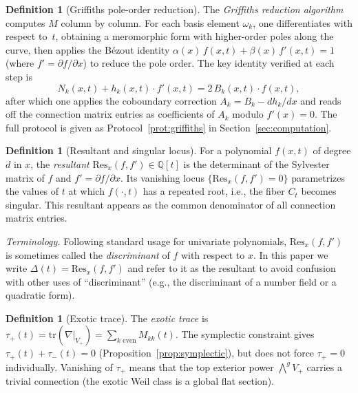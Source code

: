\documentclass[11pt]{article}
\theoremstyle{plain}
\theoremstyle{definition}
\newtheorem{definition}[theorem]{Definition}
\theoremstyle{remark}
\newcommand{\Q}{\mathbb{Q}}
\newcommand{\tr}{\mathrm{tr}}
\begin{document}
\begin{definition}[Griffiths pole-order reduction]\label{def:griffiths}
The \emph{Griffiths reduction algorithm}~\cite{Griffiths1969} computes
$M$ column by column.  For each basis element $\omega_k$, one
differentiates with respect to~$t$, obtaining a meromorphic form with
higher-order poles along the curve, then applies the B\'ezout identity
$\alpha(x)\, f(x,t) + \beta(x)\, f'(x,t) = 1$ (where $f' = \partial f / \partial x$)
to reduce the pole order.  The key identity verified at each step is
\begin{equation}\label{eq:griffiths-id-prelim}
  N_k(x,t) + h_k(x,t) \cdot f'(x,t) = 2\, B_k(x,t) \cdot f(x,t),
\end{equation}
after which one applies the coboundary correction $A_k = B_k - dh_k/dx$
and reads off the connection matrix entries as coefficients of $A_k$
modulo $f'(x) = 0$.  The full protocol is given as
Protocol~\ref{prot:griffiths} in Section~\ref{sec:computation}.
\end{definition}

\begin{definition}[Resultant and singular locus]\label{def:resultant}
For a polynomial $f(x,t)$ of degree $d$ in $x$, the \emph{resultant}
$\mathrm{Res}_x(f, f') \in \Q[t]$ is the determinant of the Sylvester
matrix of $f$ and $f' = \partial f / \partial x$.  Its vanishing locus
$\{\mathrm{Res}_x(f, f') = 0\}$ parametrizes the values of $t$ at
which $f(\cdot, t)$ has a repeated root, i.e., the fiber $C_t$ becomes
singular.  This resultant appears as the common denominator of all
connection matrix entries.

\emph{Terminology.}  Following standard usage for univariate
polynomials, $\mathrm{Res}_x(f, f')$ is sometimes called the
\emph{discriminant} of $f$ with respect to $x$.  In this paper we
write $\Delta(t) = \mathrm{Res}_x(f, f')$ and refer to it as the
resultant to avoid confusion with other uses of ``discriminant''
(e.g., the discriminant of a number field or a quadratic form).
\end{definition}

\begin{definition}[Exotic trace]\label{def:exotic-trace}
The \emph{exotic trace} is
$\tau_+(t) = \tr(\nabla|_{V_+}) = \sum_{k \text{ even}} M_{kk}(t)$.
The symplectic constraint gives $\tau_+(t) + \tau_-(t) = 0$
(Proposition~\ref{prop:symplectic}), but does not force $\tau_+ = 0$
individually.  Vanishing of $\tau_+$ means that the top exterior
power $\bigwedge^g V_+$ carries a trivial connection (the exotic Weil
class is a global flat section).
\end{definition}
\end{document}
